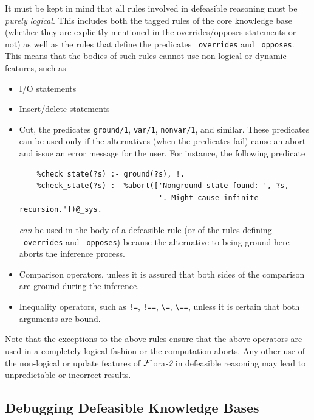 \documentclass[11pt]{article}
\newcommand{\FLORA}{{\mbox{\sc ${\cal F}${lora}\rm\emph{-2}}}\xspace}
\begin{document}
It must be kept in mind that all rules involved in defeasible reasoning
must be \emph{purely logical}. This includes both the tagged rules of the
core knowledge base (whether they are explicitly mentioned in the
overrides/opposes statements or not) as well as the rules that define the
predicates {\tt \_overrides} and {\tt \_opposes}.  This means that the
bodies of such rules cannot use non-logical or dynamic features, such as
\begin{itemize}
\item  I/O statements
\item  Insert/delete statements
\item  Cut, the predicates {\tt ground/1}, {\tt var/1}, {\tt nonvar/1}, and
  similar.
  These predicates can be used only if the alternatives (when
  the predicates fail) cause an abort and issue an error message for the user.
  For instance, the following predicate
\begin{verbatim}
    %check_state(?s) :- ground(?s), !.
    %check_state(?s) :- %abort(['Nonground state found: ', ?s,
                                '. Might cause infinite recursion.'])@_sys.  
\end{verbatim}
  \emph{can} be used in the body of a defeasible rule (or of the rules defining
  {\tt \_overrides} and {\tt \_opposes}) because the alternative to being
  ground here aborts the inference process.
\item  Comparison operators, unless it is assured that both sides of the
  comparison are ground during the inference.
\item  Inequality operators, such as {\tt !=}, {\tt !==}, \verb|\=|,
  \verb|\==|,  unless it is certain that both arguments are bound.
\end{itemize}
Note that the exceptions to the above rules ensure that the above operators
are used in a completely logical fashion or the computation aborts. Any
other use of the non-logical or update features of \FLORA in defeasible
reasoning may lead to unpredictable or incorrect results.


\subsection{Debugging Defeasible Knowledge Bases}
\label{sec-debugging-defeat}
\end{document}

